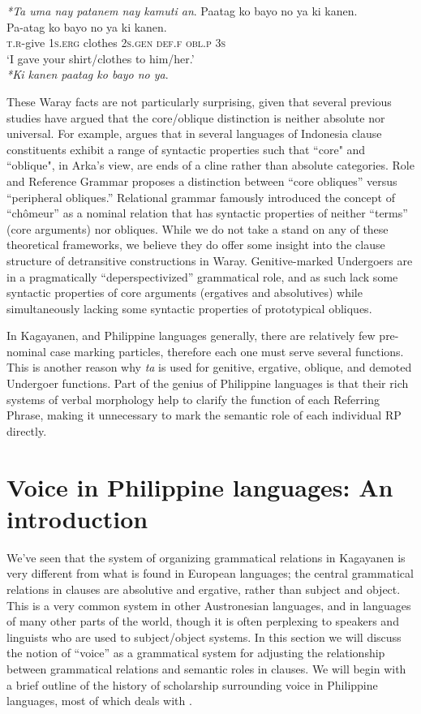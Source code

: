 \textit{*Ta uma nay patanem nay kamuti an}.
\z
\ea
Paatag  ko  bayo  no  ya  ki  kanen. \\\smallskip
\gll Pa-atag  ko  bayo  no  ya  ki  kanen. \\
\textsc{t.r}-give  1\textsc{s.erg}  clothes  2\textsc{s.gen}  \textsc{def.f}  \textsc{obl.p}  3\textsc{s} \\
\glt ‘I gave your shirt/clothes to him/her.’\\\smallskip
\textit{*Ki kanen paatag ko bayo no ya}.
\z

These Waray facts are not particularly surprising, given that several previous studies have argued that the core/oblique distinction is neither absolute nor universal. For example, \citep{arka2019} argues that in several languages of Indonesia clause constituents exhibit a range of syntactic properties such that “core" and “oblique", in Arka's view, are ends of a cline rather than absolute categories. Role and Reference Grammar \citep{vanvalin1997, vanvalin2000} proposes a distinction between “core obliques” versus “peripheral obliques.” Relational grammar \citep{perlmutter1986} famously introduced the concept of “chômeur” as a nominal relation that has syntactic properties of neither “terms” (core arguments) nor obliques. While we do not take a stand on any of these theoretical frameworks, we believe they do offer some insight into the clause structure of detransitive constructions in Waray. Genitive-marked Undergoers are in a pragmatically “deperspectivized” grammatical role, and as such lack some syntactic properties of core arguments (ergatives and absolutives) while simultaneously lacking some syntactic properties of prototypical obliques. 

In Kagayanen, and Philippine languages generally, there are relatively few pre-nominal case marking particles, therefore each one must serve several functions. This is another reason why \textit{ta} is used for genitive, ergative, oblique, and demoted Undergoer functions. Part of the genius of Philippine languages is that their rich systems of verbal morphology help to clarify the function of each Referring Phrase, making it unnecessary to mark the semantic role of each individual RP directly.
\section{Voice in Philippine languages: An introduction}
\label{sec:voiceinphilippinelanguages}

We’ve seen that the system of organizing grammatical relations in Kagayanen is very different from what is found in European languages; the central grammatical relations in clauses are absolutive and ergative, rather than subject and object. This is a very common system in other Austronesian languages, and in languages of many other parts of the world, though it is often perplexing to speakers and linguists who are used to subject/object systems. In this section we will discuss the notion of “voice” as a grammatical system for adjusting the relationship between grammatical relations and semantic roles in clauses. We will begin with a brief outline of the history of scholarship surrounding voice in Philippine languages, most of which deals with .

